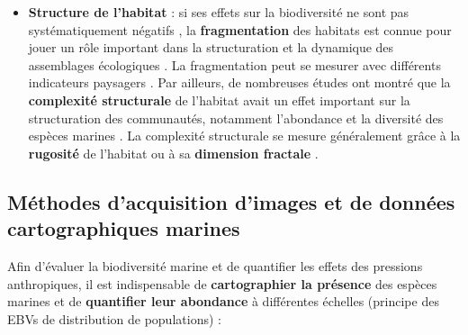 \begin{itemize}
    \item \textbf{Structure de l’habitat} : si ses effets sur la biodiversité ne sont pas systématiquement négatifs \citep{fahrig_ecological_2017}, la \textbf{fragmentation} des habitats est connue pour jouer un rôle important dans la structuration et la dynamique des assemblages écologiques \citep{wilson_habitat_2016, crooks_quantification_2017}. La fragmentation peut se mesurer avec différents indicateurs paysagers \citep{de_montis_landscape_2017}. Par ailleurs, de nombreuses études ont montré que la \textbf{complexité structurale} de l’habitat avait un effet important sur la structuration des communautés, notamment l’abondance et la diversité des espèces marines \citep{luckhurst_analysis_1978, gratwicke_relationship_2005, harborne_biotic_2011, meager_topographic_2011, kovalenko_habitat_2012, graham_importance_2013, rees_abiotic_2014, darling_relationships_2017}. La complexité structurale se mesure généralement grâce à la \textbf{rugosité} de l’habitat \citep{friedman_multi-scale_2012, dustan_digital_2013, leon_measuring_2015} ou à sa \textbf{dimension fractale} \citep{yanovski_structural_2017, young_cost_2017, fukunaga_integrating_2019}.
    
\end{itemize}

\setlength{\fboxsep}{5pt}
\setlength{\fboxrule}{0.6pt}
\noindent{}

\subsection[Méthodes d’acquisition d’images et de données cartographiques marines]{Méthodes d’acquisition d’images et de données \\cartographiques marines}\label{intro.2.2}

Afin d’évaluer la biodiversité marine et de quantifier les effets des pressions anthropiques, il est indispensable de \textbf{cartographier la présence} des espèces marines et de \textbf{quantifier leur abondance} à différentes échelles (principe des EBVs de distribution de populations) :

